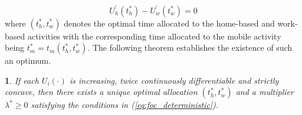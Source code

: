 \documentclass[12pt,a4paper,british]{article}
\theoremstyle{definition}
\theoremstyle{plain}
\newtheorem{thm}{\protect\theoremname}
\theoremstyle{plain}
\providecommand{\theoremname}{Theorem}
\begin{document}
\begin{equation}
U_{h}^{\prime}\left(t_{h}^{\ast}\right)-U_{w}^{\prime}\left(t_{w}^{\ast}\right)=0\label{eq:Uh_eq_Uw}
\end{equation}
where $\left(t_{h}^{\ast},t_{w}^{\ast}\right)$ denotes the optimal
time allocated to the home-based and work-based activities with the
corresponding time allocated to the mobile activity being $t_{m}^{\ast}=t_{m}\left(t_{h}^{\ast},t_{w}^{\ast}\right)$.
The following theorem establishes the existence of such an optimum.
\begin{thm}
If each $U_{i}\left(\cdot\right)$ is increasing, twice continuously
differentiable and strictly concave, then there exists a unique optimal
allocation $\left(t_{h}^{\ast},t_{w}^{\ast}\right)$ and a multiplier
\textup{$\lambda^{\ast}\geq0$} satisfying the conditions in (\ref{eq:foc_deterministic}).
\end{thm}
\end{document}
